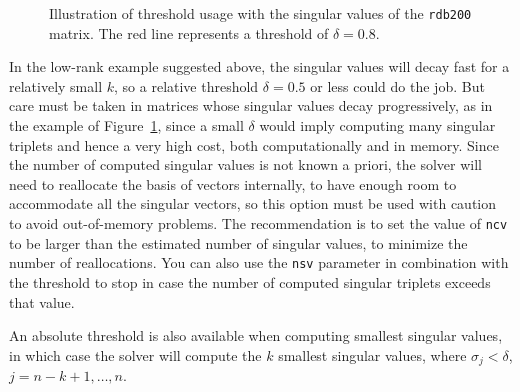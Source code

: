 \begin{figure}
\begin{center}
\end{center}
\caption{\label{fig:thres}Illustration of threshold usage with the singular values of the \texttt{rdb200} matrix. The red line represents a threshold of $\delta=0.8$.}
\end{figure}

In the low-rank example suggested above, the singular values will decay fast for a relatively small $k$, so a relative threshold $\delta=0.5$ or less could do the job. But care must be taken in matrices whose singular values decay progressively, as in the example of Figure~\ref{fig:thres}, since a small $\delta$ would imply computing many singular triplets and hence a very high cost, both computationally and in memory. Since the number of computed singular values is not known a priori, the solver will need to reallocate the basis of vectors internally, to have enough room to accommodate all the singular vectors, so this option must be used with caution to avoid out-of-memory problems. The recommendation is to set the value of \texttt{ncv} to be larger than the estimated number of singular values, to minimize the number of reallocations. You can also use the \texttt{nsv} parameter in combination with the threshold to stop in case the number of computed singular triplets exceeds that value.

An absolute threshold is also available when computing smallest singular values, in which case the solver will compute the $k$ smallest singular values, where $\sigma_j<\delta$, $j=n-k+1,\dots,n$.

